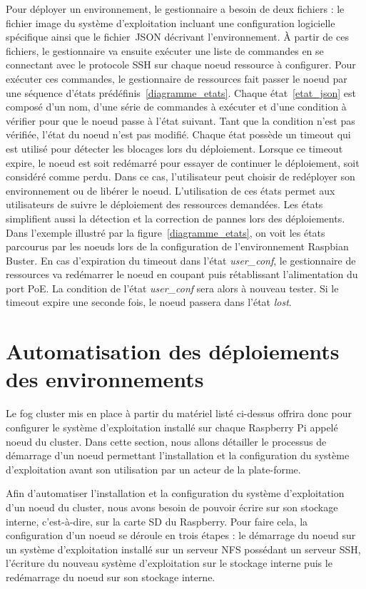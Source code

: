 \documentclass[letterpaper, 10 pt, conference]{ieeeconf}
\begin{document}
Pour déployer un environnement, le gestionnaire a besoin de deux fichiers : le fichier image du système d'exploitation incluant une configuration logicielle spécifique ainsi que le fichier~JSON décrivant l'environnement. À partir de ces fichiers, le gestionnaire va ensuite exécuter une liste de commandes en se connectant avec le protocole SSH sur chaque noeud ressource à configurer. Pour exécuter ces commandes, le gestionnaire de ressources fait passer le noeud par une séquence d'états prédéfinis~\ref{diagramme_etats}. Chaque état~\ref{etat_json} est composé d'un nom, d'une série de commandes à exécuter et d'une condition à vérifier pour que le noeud passe à l'état suivant. Tant que la condition n'est pas vérifiée, l'état du noeud n'est pas modifié. Chaque état possède un timeout qui est utilisé pour détecter les blocages lors du déploiement. Lorsque ce timeout expire, le noeud est soit redémarré pour essayer de continuer le déploiement, soit considéré comme perdu. Dans ce cas, l'utilisateur peut choisir de redéployer son environnement ou de libérer le noeud. L'utilisation de ces états permet aux utilisateurs de suivre le déploiement des ressources demandées. Les états simplifient aussi la détection et la correction de pannes lors des déploiements. Dans l'exemple illustré par la figure~\ref{diagramme_etats}, on voit les états parcourus par les noeuds lors de la configuration de l'environnement Raspbian Buster. En cas d'expiration du timeout dans l'état \textit{user\_conf}, le gestionnaire de ressources va redémarrer le noeud en coupant puis rétablissant l'alimentation du port PoE. La condition de l'état \textit{user\_conf} sera alors à nouveau tester. Si le timeout expire une seconde fois, le noeud passera dans l'état \textit{lost}.

\section{Automatisation des déploiements des environnements}
\label{sec:os_install}
Le fog cluster mis en place à partir du matériel listé ci-dessus offrira donc pour configurer le système d'exploitation installé sur chaque Raspberry Pi appelé noeud du cluster. Dans cette section, nous allons détailler le processus de démarrage d'un noeud permettant l'installation et la configuration du système d'exploitation avant son utilisation par un acteur de la plate-forme.

Afin d'automatiser l'installation et la configuration du système d'exploitation d'un noeud du cluster, nous avons besoin de pouvoir écrire sur son stockage interne, c'est-à-dire, sur la carte SD du Raspberry. Pour faire cela, la configuration d'un noeud se déroule en trois étapes : le démarrage du noeud sur un système d'exploitation installé sur un serveur NFS possédant un serveur SSH, l'écriture du nouveau système d'exploitation sur le stockage interne puis le redémarrage du noeud sur son stockage interne.
\end{document}
